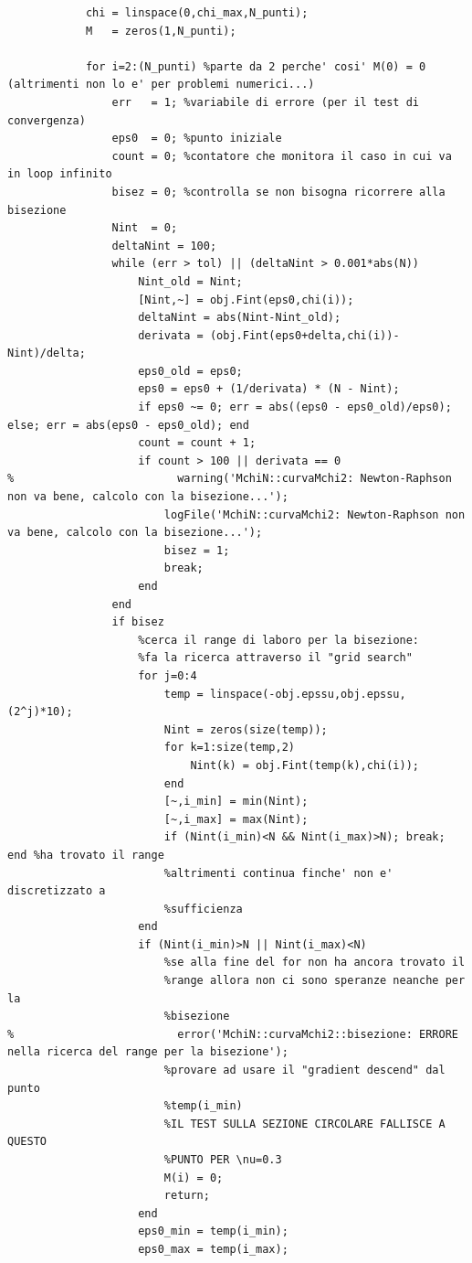 \documentclass[10pt]{article}
\begin{document}
\begin{lstlisting}
            chi = linspace(0,chi_max,N_punti);
            M   = zeros(1,N_punti);
            
            for i=2:(N_punti) %parte da 2 perche' cosi' M(0) = 0 (altrimenti non lo e' per problemi numerici...)
                err   = 1; %variabile di errore (per il test di convergenza)
                eps0  = 0; %punto iniziale
                count = 0; %contatore che monitora il caso in cui va in loop infinito
                bisez = 0; %controlla se non bisogna ricorrere alla bisezione
                Nint  = 0;
                deltaNint = 100;
                while (err > tol) || (deltaNint > 0.001*abs(N))
                    Nint_old = Nint;
                    [Nint,~] = obj.Fint(eps0,chi(i));
                    deltaNint = abs(Nint-Nint_old);
                    derivata = (obj.Fint(eps0+delta,chi(i))-Nint)/delta;
                    eps0_old = eps0;
                    eps0 = eps0 + (1/derivata) * (N - Nint);
                    if eps0 ~= 0; err = abs((eps0 - eps0_old)/eps0); else; err = abs(eps0 - eps0_old); end
                    count = count + 1;
                    if count > 100 || derivata == 0
%                         warning('MchiN::curvaMchi2: Newton-Raphson non va bene, calcolo con la bisezione...');
                        logFile('MchiN::curvaMchi2: Newton-Raphson non va bene, calcolo con la bisezione...');
                        bisez = 1;
                        break;
                    end
                end
                if bisez
                    %cerca il range di laboro per la bisezione:
                    %fa la ricerca attraverso il "grid search"
                    for j=0:4
                        temp = linspace(-obj.epssu,obj.epssu,(2^j)*10);
                        Nint = zeros(size(temp));
                        for k=1:size(temp,2)
                            Nint(k) = obj.Fint(temp(k),chi(i));
                        end
                        [~,i_min] = min(Nint);
                        [~,i_max] = max(Nint);
                        if (Nint(i_min)<N && Nint(i_max)>N); break; end %ha trovato il range
                        %altrimenti continua finche' non e' discretizzato a
                        %sufficienza
                    end
                    if (Nint(i_min)>N || Nint(i_max)<N)
                        %se alla fine del for non ha ancora trovato il
                        %range allora non ci sono speranze neanche per la
                        %bisezione
%                         error('MchiN::curvaMchi2::bisezione: ERRORE nella ricerca del range per la bisezione');
                        %provare ad usare il "gradient descend" dal punto
                        %temp(i_min)
                        %IL TEST SULLA SEZIONE CIRCOLARE FALLISCE A QUESTO
                        %PUNTO PER \nu=0.3
                        M(i) = 0;
                        return;
                    end
                    eps0_min = temp(i_min);
                    eps0_max = temp(i_max);
                    

\end{lstlisting}
\end{document}
